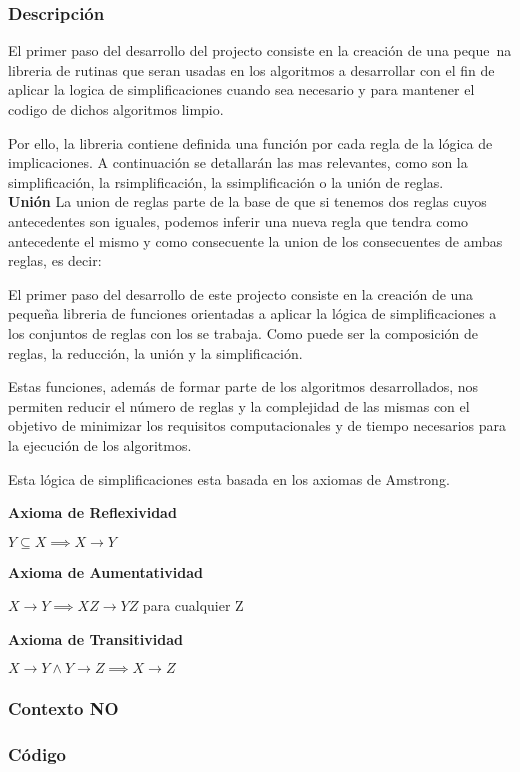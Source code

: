 \subsubsection{Descripci\'on} 
El primer paso del desarrollo del projecto consiste en la creaci\'on de una peque\!~na libreria de rutinas que seran usadas en los algoritmos a desarrollar con el fin de aplicar la logica de simplificaciones cuando sea necesario y para mantener el codigo de dichos algoritmos limpio.

Por ello, la libreria contiene definida una funci\'on por cada regla de la l\'ogica de implicaciones. A continuaci\'on se detallar\'an las mas relevantes, como son la simplificaci\'on, la rsimplificaci\'on, la ssimplificaci\'on o la uni\'on de reglas.\\
\textbf{Uni\'on}
La union de reglas parte de la base de que si tenemos dos reglas cuyos antecedentes son iguales, podemos inferir una nueva regla que tendra como antecedente el mismo y como consecuente la union de los consecuentes de ambas reglas, es decir:


El primer paso del desarrollo de este projecto consiste en la creaci\'on de una peque\~na libreria de funciones
orientadas a aplicar la l\'ogica de simplificaciones a los conjuntos de reglas con los se trabaja. Como 
puede ser la composici\'on de reglas, la reducci\'on, la uni\'on y la simplificaci\'on.

Estas funciones, adem\'as de formar parte de los algoritmos desarrollados, nos permiten reducir el n\'umero de 
reglas y la complejidad de las mismas con el objetivo de minimizar los requisitos computacionales y de tiempo
necesarios para la ejecuci\'on de los algoritmos.

Esta l\'ogica de simplificaciones esta basada en los axiomas de Amstrong.

\textbf{Axioma de Reflexividad}

\begin{center}
    \(Y \subseteq X \implies X \to Y \)
\end{center}

\textbf{Axioma de Aumentatividad}

\begin{center}
    \(X \to Y \implies XZ \to YZ \) para cualquier Z
\end{center}

\textbf{Axioma de Transitividad}

\begin{center}
    \(X \to Y \wedge Y \to Z \implies X \to Z \)
\end{center}



\subsubsection{Contexto NO} 
\newpage
\subsubsection{C\'odigo} 

